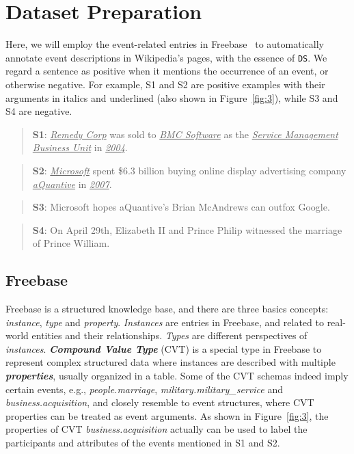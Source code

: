 \section{Dataset Preparation}
Here, we will employ the event-related entries in Freebase~\cite{bollacker2008freebase} to automatically annotate event descriptions in Wikipedia's pages, with the essence of  \texttt{DS}. We regard a sentence as positive when it mentions the occurrence of an event, or otherwise negative. For example, S1 and S2 are positive examples with their arguments in italics and underlined (also shown in Figure~\ref{fig:3}), while S3 and S4 are negative.
\begin{quote}
	\textbf{S1}: \underline{\emph{Remedy Corp}} was sold to \underline{\emph{BMC Software}} as the \underline{\emph{Service Management Business Unit}} in \underline{\emph{2004}}.
\end{quote}
\begin{quote}
	\textbf{S2}: \underline{\emph{Microsoft}} spent \$6.3 billion buying online display advertising company \underline{\emph{aQuantive}} in \underline{\emph{2007}}.
\end{quote}
\begin{quote}
	\textbf{S3}: Microsoft hopes aQuantive's Brian McAndrews can outfox Google.
\end{quote}
\begin{quote}
	\textbf{S4}: On April 29th, Elizabeth II and Prince Philip witnessed the marriage of Prince William.
\end{quote}
%
\subsection{Freebase}
Freebase is a structured knowledge base, and there are three basics concepts: \emph{instance}, \emph{type} and \emph{property}. \emph{Instances} are entries in Freebase, and related to real-world entities and their relationships. \emph{Types} are different perspectives of \emph{instances}. \textbf{\emph{Compound Value Type}} (CVT) is a special type in Freebase to represent complex structured data where instances are described with multiple \textbf{\emph{properties}}, usually organized in a table. Some of the CVT schemas indeed imply certain events, e.g., \emph{people.marriage}, \emph{military.military\_service} and \emph{business.acquisition}, and closely resemble to event structures, where CVT properties can be treated as event arguments. As shown in Figure~\ref{fig:3}, the properties of CVT  \emph{business.acquisition}  actually can be used to label  %
the participants and attributes of the events mentioned in S1 and S2.

